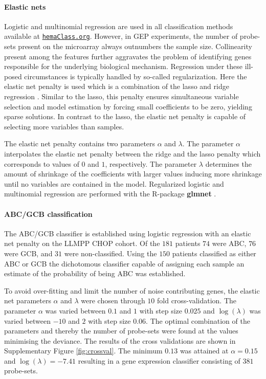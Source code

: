 \documentclass[10pt,letterpaper]{article}
\newcommand{\hemaClass}{\href{http://hemaClass.org}{\texttt{hemaClass.org}}}
\newcommand{\R}{\textsf{R}}
\newcommand{\pkg}[1]{\textbf{#1}}
\begin{document}
\paragraph{Elastic nets}
Logistic and multinomial regression are used in all classification methods available at \hemaClass{}.
However, in GEP experiments, the number of probe-sets present on the microarray always outnumbers the sample size.
Collinearity present among the features further aggravates the problem of identifying genes responsible for the underlying biological mechanism.
Regression under these ill-posed circumstances is typically handled by so-called regularization.
Here the elastic net penalty \cite{Friedman2010, Zou2005} is used which is a combination of the lasso \cite{Tibshirani1996} and ridge regression \cite{Hoerl1970}.
Similar to the lasso, this penalty ensures simultaneous variable selection and model estimation by forcing small coefficients to be zero, yielding sparse solutions.
In contrast to the lasso, the elastic net penalty is capable of selecting more variables than samples.

The elastic net penalty contains two parameters $\alpha$ and $\lambda$.
The parameter $\alpha$ interpolates the elastic net penalty between the ridge and the lasso penalty which corresponds to values of $0$ and $1$, respectively.
The parameter $\lambda$ determines the amount of shrinkage of the coefficients with larger values inducing more shrinkage until no variables are contained in the model.
Regularized logistic and multinomial regression are performed with the \R{}-package \pkg{glmnet} \cite{Friedman2010}.

\paragraph{ABC/GCB classification}
The ABC/GCB classifier is established using logistic regression with an elastic net penalty on the LLMPP CHOP cohort.
Of the $181$ patients $74$ were ABC, $76$ were GCB, and $31$ were non-classified.
Using the $150$ patients classified as either ABC or GCB the dichotomous classifier capable of assigning each sample an estimate of the probability of being ABC was established.

To avoid over-fitting and limit the number of noise contributing genes, the elastic net parameters $\alpha$ and $\lambda$ were chosen through $10$ fold cross-validation.
The parameter $\alpha$ was varied between $0.1$ and $1$ with step size $0.025$ and $\log(\lambda)$ was varied between $-10$ and $2$ with step size $0.06$.
The optimal combination of the parameters and thereby the number of probe-sets were found at the values minimising the deviance.
The results of the cross validations are shown in Supplementary Figure \ref{fig:crossval}.
The minimum $0.13$ was attained at $\alpha = 0.15$ and $\log(\lambda) = -7.41$ resulting in a gene expression classifier consisting of $381$ probe-sets.
\end{document}
